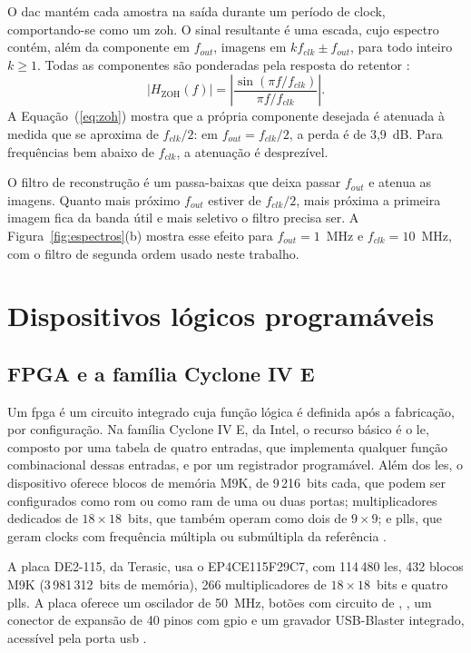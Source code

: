 O \ac{dac} mantém cada amostra na saída durante um período de clock, comportando-se como um \ac{zoh}. O sinal resultante é uma escada, cujo espectro contém, além da componente em \(f_{out}\), imagens em \(k f_{clk} \pm f_{out}\), para todo inteiro \(k \geq 1\). Todas as componentes são ponderadas pela resposta do retentor \cites{kester2005,oppenheim2010}:
\begin{equation}\label{eq:zoh}
	\left|H_{\mathrm{ZOH}}(f)\right| = \left|\frac{\sin(\pi f/f_{clk})}{\pi f/f_{clk}}\right|.
\end{equation}
A Equação~(\ref{eq:zoh}) mostra que a própria componente desejada é atenuada à medida que se aproxima de \(f_{clk}/2\): em \(f_{out} = f_{clk}/2\), a perda é de 3,9~dB. Para frequências bem abaixo de \(f_{clk}\), a atenuação é desprezível.

O filtro de reconstrução é um passa-baixas que deixa passar \(f_{out}\) e atenua as imagens. Quanto mais próximo \(f_{out}\) estiver de \(f_{clk}/2\), mais próxima a primeira imagem fica da banda útil e mais seletivo o filtro precisa ser. A Figura~\ref{fig:espectros}(b) mostra esse efeito para \(f_{out} = 1\)~MHz e \(f_{clk} = 10\)~MHz, com o filtro de segunda ordem usado neste trabalho.

\section{Dispositivos lógicos programáveis}

\subsection{FPGA e a família Cyclone IV E}

Um \ac{fpga} é um circuito integrado cuja função lógica é definida após a fabricação, por configuração. Na família Cyclone IV E, da Intel, o recurso básico é o \ac{le}, composto por uma tabela de quatro entradas, que implementa qualquer função combinacional dessas entradas, e por um registrador programável. Além dos \acp{le}, o dispositivo oferece blocos de memória M9K, de 9\,216~bits cada, que podem ser configurados como \ac{rom} ou como \ac{ram} de uma ou duas portas; multiplicadores dedicados de \(18 \times 18\)~bits, que também operam como dois de \(9 \times 9\); e \acp{pll}, que geram clocks com frequência múltipla ou submúltipla da referência \cite{intel2016cyclone}.

A placa DE2-115, da Terasic, usa o EP4CE115F29C7, com 114\,480 \acp{le}, 432 blocos M9K (3\,981\,312~bits de memória), 266 multiplicadores de \(18 \times 18\)~bits e quatro \acp{pll}. A placa oferece um oscilador de 50~MHz, botões com circuito de , , um conector de expansão de 40 pinos com \ac{gpio} e um gravador USB-Blaster integrado, acessível pela porta \ac{usb} \cite{terasic2010}.

